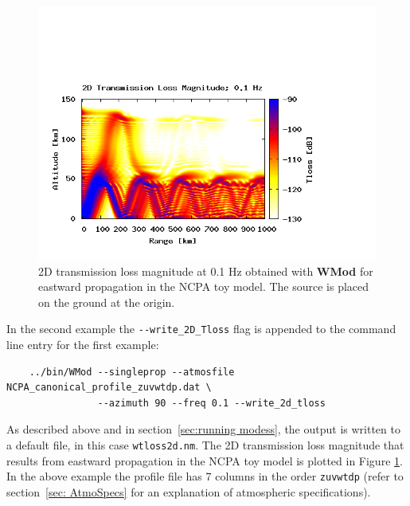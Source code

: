 \begin{figure}
\begin{center}
\includegraphics[scale=0.45,trim = 20 20 110 140,clip]{figs/wmod_ex2}
\end{center}
\caption{2D transmission loss magnitude at 0.1 Hz obtained with {\bf WMod} for eastward propagation in the NCPA toy model. The source is placed on the ground at the origin.}
\label{fig: wmod 2D tl}
\end{figure}

\newpage

In the second example the \verb+--write_2D_Tloss+ flag is appended to the command line entry for the first example: 
\begin{verbatim} 
    ../bin/WMod --singleprop --atmosfile NCPA_canonical_profile_zuvwtdp.dat \ 
                --azimuth 90 --freq 0.1 --write_2d_tloss
\end{verbatim}
As described above and in section~\ref{sec:running modess}, the output is written to a default file, in this case \verb+wtloss2d.nm+. The 2D transmission loss magnitude that results from eastward propagation in the NCPA toy model is plotted in Figure \ref{fig: wmod 2D tl}.  In the above example the profile file has 7 columns in the order \verb"zuvwtdp" (refer to section~\ref{sec: AtmoSpecs}  for an explanation of atmospheric specifications).

